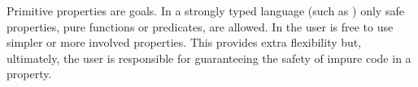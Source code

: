 Primitive properties are \Prolog{} goals.
%
In a strongly typed language (such as \Haskell{}) only
safe properties, pure functions or predicates, are allowed.
%
In \plqc{} the user is free to use simpler or more involved properties.
%
This provides extra flexibility but, ultimately, the user is
responsible for guaranteeing the safety of impure code in a property.






